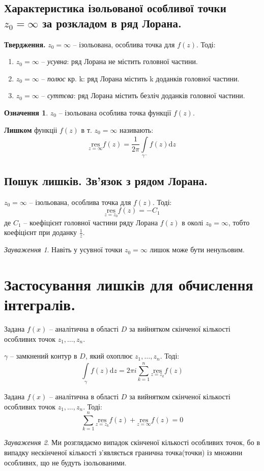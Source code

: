\documentclass[a4paper]{scrartcl}
\theoremstyle{definition}
\newtheorem*{defo}{Означення}
\theoremstyle{remark}
\newtheorem*{remark}{Зауваження}
\theoremstyle{definition}
\theoremstyle{definition}
\def\res#1{\underset{#1}{\mathrm{res}}}
\begin{document}
\subsection{Характеристика ізольованої особливої точки $z_0 = \infty$ за розкладом в ряд Лорана.}
\textbf{Твердження.} $z_0 = \infty$ -- ізольована, особлива точка для $f(z)$. Тоді:
\begin{enumerate}
  \item $z_0 = \infty$ -- \textit{усувна}: ряд Лорана не містить головної частини.
  \item $z_0 = \infty$ -- \textit{полюс} кр. k: ряд Лорана містить k доданків головної частини.
  \item $z_0 = \infty$ -- \textit{суттєва}: ряд Лорана містить безліч доданків головної частини.
\end{enumerate}
\begin{defo}
  $z_0$ -- ізольована особлива точка функції $f(z)$.\par
   \textbf{Лишком} функціі $f(z)$ в т. $z_0 = \infty$ називають:
   $$
   \res{z=\infty} f(z) = \frac{1}{2 \pi }  \int\limits_{\gamma^-}^{}{ f(z) \mathrm{d} z}
   $$
\end{defo}

\subsection{Пошук лишків. Зв'язок з рядом Лорана.}
 \begin{boxteo}
$z_0 = \infty$ -- ізольована, особлива точка для $f(z)$. Тоді:
$$
\res{z = z_0} f(z) = -C_1
$$
де $C_{1}$ -- коефіцієнт головної частини ряду Лорана $f(z)$ в околі $z_0 = \infty$, тобто коефіцієнт при доданку $ \frac{1}{z} $.
 \end{boxteo}
\begin{remark}
  Навіть у усувної точки $z_0 = \infty$ лишок може бути ненульовим.
\end{remark}
\newpage
\section{Застосування лишків для обчислення інтегралів.}
\begin{boxteo}
  Задана $f(x)$ -- аналітична в області $D$ за вийнятком скінченої кількості особливих точок $z_1 , \dots , z_n$.\par
  $\gamma$ -- замкнений контур в $D$, який охоплює $z_1 , \dots , z_n$. Тоді:
  $$
   \int\limits_{\gamma}^{}{ f(z) \mathrm{d} z} = 2 \pi i  \sum\limits_{k = 1}^{n}{ \res{z = z_k }f(z)}
  $$
\end{boxteo}
\begin{boxteo}
  Задана $f(x)$ -- аналітична в області $D$ за вийнятком скінченої кількості особливих точок $z_1 , \dots , z_n$. Тоді:
  $$
    \sum\limits_{k = 1}^{n}{\res{z = z_k }f(z) } + \res{z = \infty} f(z) = 0
  $$
\end{boxteo}
\begin{remark}
  Ми розглядаємо випадок скінченої кількості особливих точок, бо в випадку нескінченої кількості з'являється гранична точка(точки) із множини особливих, що не будуть ізольованими.
\end{remark}
\end{document}

